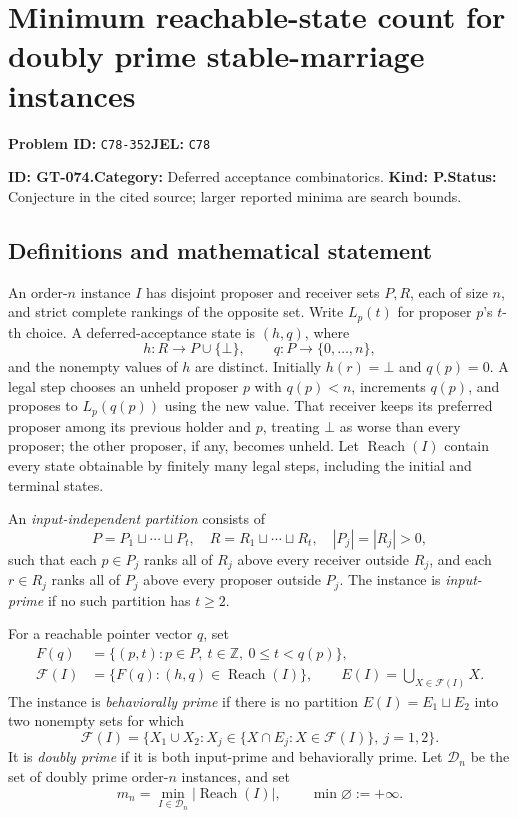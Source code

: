 \documentclass[11pt,a4paper]{article}
\begin{document}
\section*{Minimum reachable-state count for doubly prime stable-marriage instances}
\textbf{Problem ID:} \texttt{C78-352}\quad \textbf{JEL:} \texttt{C78}\par
\label{problem:OP-0204}
\label{game:GT-074}
{\sffamily\small\color{muted}
\noindent\textbf{ID: GT-074.}\quad\textbf{Category:} Deferred acceptance combinatorics.
\quad\textbf{Kind: P.}\quad\textbf{Status:} Conjecture in the cited source;
larger reported minima are search bounds.
\par}
\subsection*{Definitions and mathematical statement}
An order-\(n\) instance \(I\) has disjoint proposer and receiver sets
\(P,R\), each of size \(n\), and strict complete rankings of the
opposite set. Write \(L_p(t)\) for proposer \(p\)'s \(t\)-th choice.
A deferred-acceptance state is \((h,q)\), where
\[
 h:R\to P\cup\{\bot\},\qquad q:P\to\{0,\ldots,n\},
\]
and the nonempty values of \(h\) are distinct. Initially \(h(r)=\bot\)
and \(q(p)=0\). A legal step chooses an unheld proposer \(p\)
with \(q(p)<n\), increments \(q(p)\), and proposes to \(L_p(q(p))\)
using the new value. That receiver keeps its preferred proposer among
its previous holder and \(p\), treating \(\bot\) as worse than every
proposer; the other proposer, if any, becomes unheld.
Let \(\operatorname{Reach}(I)\) contain every state obtainable by
finitely many legal steps, including the initial and terminal states.

An \emph{input-independent partition} consists of
\[
 P=P_1\sqcup\cdots\sqcup P_t,\quad
 R=R_1\sqcup\cdots\sqcup R_t,\quad |P_j|=|R_j|>0,
\]
such that each \(p\in P_j\) ranks all of \(R_j\) above every receiver
outside \(R_j\), and each \(r\in R_j\) ranks all of \(P_j\) above
every proposer outside \(P_j\).
The instance is \emph{input-prime} if no such partition has \(t\geq 2\).

For a reachable pointer vector \(q\), set
\[
 \begin{aligned}
 F(q)&=\{(p,t):p\in P,\ t\in\mathbb Z,\ 0\leq t<q(p)\},\\
 \mathcal F(I)&=\{F(q):(h,q)\in\operatorname{Reach}(I)\},\qquad
 E(I)=\bigcup_{X\in\mathcal F(I)}X.
 \end{aligned}
\]
The instance is \emph{behaviorally prime} if there is no partition
\(E(I)=E_1\sqcup E_2\) into two nonempty sets for which
\[
 \mathcal F(I)=
 \{X_1\cup X_2:
       X_j\in\{X\cap E_j:X\in\mathcal F(I)\},\ j=1,2\}.
\]
It is \emph{doubly prime} if it is both input-prime and behaviorally
prime. Let \(\mathcal D_n\) be the set of doubly prime order-\(n\)
instances, and set
\[
 m_n=\min_{I\in\mathcal D_n}|\operatorname{Reach}(I)|,
 \qquad \min\varnothing:=+\infty.
\]
\end{document}
